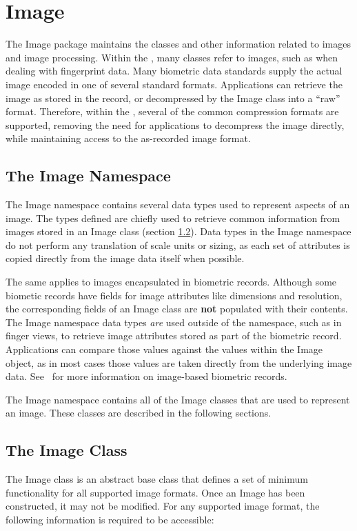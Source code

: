 %
%
\chapter{Image}
\label{chp-image}

The Image package maintains the classes and other information related to images
and image processing. Within the \lname, many classes refer to images, such as
when dealing with fingerprint data. Many biometric data standards supply the
actual image encoded in one of several standard formats. Applications can
retrieve the image as stored in the record, or decompressed by the Image class
into a ``raw'' format. Therefore, within the \sname, several of the common
compression formats are supported, removing the need for applications to
decompress the image directly, while maintaining access to the as-recorded
image format.

\section{The Image Namespace}
\label{sec-imagenamespace}
The Image namespace contains several data types used to represent
aspects of an image.  The types defined are chiefly used to retrieve common
information from images stored in an Image class (section
\ref{sec-imageclass}).  Data types in the Image namespace do not perform
any translation of scale units or sizing, as each set of attributes is copied 
directly from the image data itself when possible.

The same applies to images encapsulated in biometric records.  Although some 
biometic records have fields for image attributes like dimensions and 
resolution, the corresponding fields of an Image class are {\bf not} populated 
with their contents.  The Image namespace data types {\em are} used outside of 
the  namespace, such as in finger views, to retrieve image attributes stored as 
part of the biometric record.  Applications can compare those values against 
the values within the Image object, as in most cases those values are taken 
directly from the underlying image data.  See~ for more 
information on image-based biometric records.

The Image namespace contains all of the Image classes that are used to
represent an image. These classes are described in the following sections.

\section{The Image Class}
\label{sec-imageclass}
The Image class is an abstract base class that defines a set of minimum 
functionality for all supported image formats.  Once an Image has been 
constructed, it may not be modified.  For any supported image format, the 
following information is required to be accessible:

